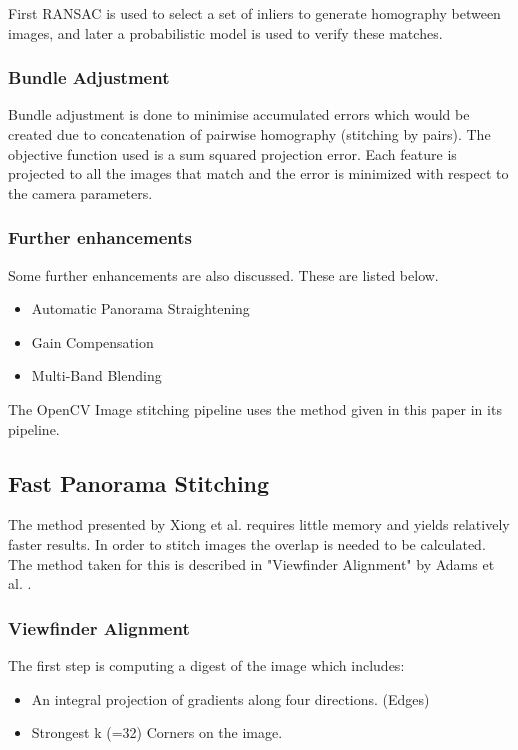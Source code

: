 First RANSAC \cite{Fischler81} is used to select a set of inliers to generate homography between images, and later a probabilistic model is used to verify these matches.

\subsubsection{Bundle Adjustment}
Bundle adjustment \cite{Triggs99} is done to minimise accumulated errors which would be created due to concatenation of pairwise homography (stitching by pairs). The objective function used is a sum squared projection error. Each feature is projected to all the images that match and the error is minimized with respect to the camera parameters. 

\subsubsection{Further enhancements}
Some further enhancements are also discussed. These are listed below. 
\begin{itemize}
\item Automatic Panorama Straightening
\item Gain Compensation
\item Multi-Band Blending
\end{itemize}

The OpenCV \cite{openCV} Image stitching pipeline uses the method given in this paper in its pipeline.

\subsection{Fast Panorama Stitching}
The method presented by Xiong et al. requires little memory and yields relatively faster results. 
In order to stitch images the overlap is needed to be calculated. The method taken for this is described in "Viewfinder Alignment" by Adams et al. \cite{Adams2008}.

\subsubsection{Viewfinder Alignment}
The first step is computing a digest of the image which includes:
\begin{itemize}
\item An integral projection of gradients along four directions. (Edges)
\item Strongest k (=32) Corners on the image.
\end{itemize}

